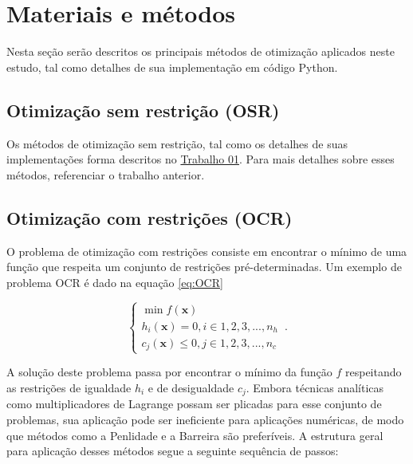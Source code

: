 \documentclass[10pt, a4paper]{article}
\begin{document}
\section{Materiais e métodos}

Nesta seção serão descritos os principais métodos de otimização aplicados neste estudo, tal como detalhes de sua implementação
em código Python.

\subsection{Otimização sem restrição (OSR)}

Os métodos de otimização sem restrição, tal como os detalhes de suas implementações forma descritos no \href{https://github.com/prj-phcp/MEC2403_Activities/blob/master/Trabalho1/Trabalho1.pdf}{Trabalho 01}.
Para mais detalhes sobre esses métodos, referenciar o trabalho anterior.

\subsection{Otimização com restrições (OCR)}

O problema de otimização com restrições consiste em encontrar o mínimo de uma função que respeita um conjunto de restrições pré-determinadas. Um exemplo de problema
OCR é dado na equação \ref{eq:OCR}

\begin{equation}\label{eq:OCR}
  \begin{cases}
    \min f(\mathbf{x})\\
    h_i(\mathbf{x}) = 0, i\in 1, 2, 3, ... , n_h\\
    c_j(\mathbf{x}) \leq 0, j\in 1, 2, 3, ... , n_c
  \end{cases}\,.
\end{equation}

A solução deste problema passa por encontrar o mínimo da função $f$ respeitando as restrições de igualdade $h_i$ e de desigualdade $c_j$.
Embora técnicas analíticas como multiplicadores de Lagrange possam ser plicadas para esse conjunto de problemas, sua aplicação pode ser ineficiente
para aplicações numéricas, de modo que métodos como a Penlidade e a Barreira são preferíveis. A estrutura geral para aplicação desses métodos
segue a seguinte sequência de passos:
\end{document}
